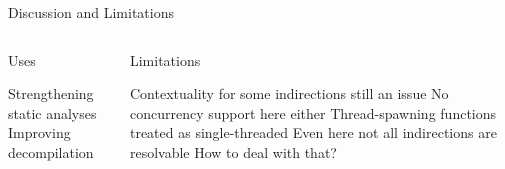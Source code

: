 \begin{frame}{Discussion and Limitations}
  \begin{columns}
    \begin{block}{Uses}
      \begin{outline}
        \1 Strengthening static analyses
        \1 Improving decompilation
      \end{outline}
    \end{block}

    \pause
    \begin{block}{Limitations}
      \begin{outline}
        \1 Contextuality for some indirections still an issue
        \1 No concurrency support here either
          \2 Thread-spawning functions treated as single-threaded
        \1 Even here not all indirections are resolvable
          \2 How to deal with that?
      \end{outline}
    \end{block}
  \end{columns}
\end{frame}
